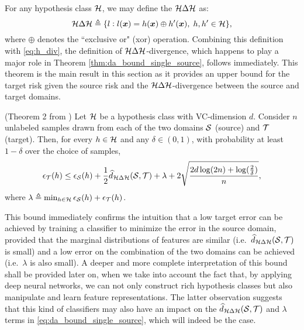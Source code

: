 For any hypothesis class ${\mathcal{H}}$, we may define the  ${\mathcal{H}} \Delta {\mathcal{H}}$ as:
\begin{equation}
\label{eq:h_delta_h}
{\mathcal{H}} \Delta {\mathcal{H}} \triangleq \{l: l({\bm{x}}) = h({\bm{x}}) \oplus h'({\bm{x}}), \; h, h' \in {\mathcal{H}}\},
\end{equation}
where $\oplus$ denotes the ``exclusive or" (xor) operation. Combining this definition with \eqref{eq:h_div}, the definition of ${\mathcal{H}} \Delta {\mathcal{H}}$-divergence, which happens to play a major role in Theorem \ref{thm:da_bound_single_source}, follows immediately. This theorem is the main result in this section as it provides an upper bound for the target risk given the source risk and the ${\mathcal{H}} \Delta {\mathcal{H}}$-divergence between the source and target domains.
\begin{theorem}
	\label{thm:da_bound_single_source} (Theorem 2 from \citet{BenDavid2010}) Let ${\mathcal{H}}$ be a hypothesis class with VC-dimension $d$. Consider $n$ unlabeled samples drawn from each of the two domains ${\mathcal{S}}$ (source) and ${\mathcal{T}}$ (target). Then, for every $h \in {\mathcal{H}}$ and any $\delta \in (0,1)$, with probability at least $1-\delta$ over the choice of samples,
	\begin{equation}
		\label{eq:da_bound_single_source}
		\epsilon_{\mathcal{T}}(h) \leq \epsilon_{\mathcal{S}}(h) + \frac{1}{2} \widehat{d}_{{\mathcal{H}} \Delta {\mathcal{H}}}({\mathcal{S}}, {\mathcal{T}}) + \lambda + 2\sqrt{\frac{2d\log(2n) + \log(\frac{2}{\delta})}{n}},
	\end{equation}
	where $\lambda \triangleq \min_{h \in {\mathcal{H}}} \epsilon_{\mathcal{S}}(h) + \epsilon_{\mathcal{T}}(h)$.
\end{theorem}
This bound immediately confirms the intuition that a low target error can be achieved by training a classifier to minimize the error in the source domain, provided that the marginal distributions of features are similar (i.e.\ $\widehat{d}_{{\mathcal{H}} \Delta {\mathcal{H}}}({\mathcal{S}}, {\mathcal{T}})$ is small) and a low error on the combination of the two domains can be achieved (i.e.\ $\lambda$ is also small). A deeper and more complete interpretation of this bound shall be provided later on, when we take into account the fact that, by applying deep neural networks, we can not only construct rich hypothesis classes but also manipulate and learn feature representations. The latter observation suggests that this kind of classifiers may also have an impact on the $\widehat{d}_{{\mathcal{H}} \Delta {\mathcal{H}}}({\mathcal{S}}, {\mathcal{T}})$ and $\lambda$ terms in \eqref{eq:da_bound_single_source}, which will indeed be the case.

